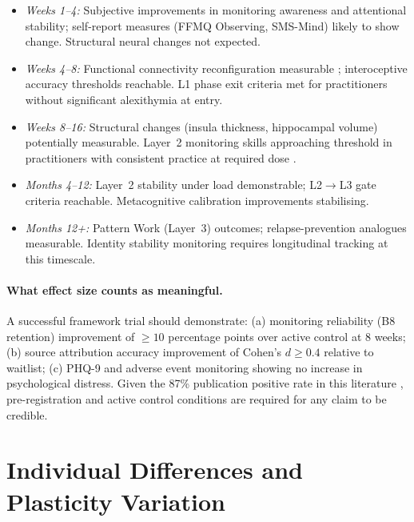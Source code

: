 \documentclass[12pt, a4paper]{article}
\begin{document}
\begin{itemize}[leftmargin=2em]
\item \emph{Weeks 1--4:} Subjective improvements in monitoring awareness and
attentional stability; self-report measures (FFMQ Observing, SMS-Mind) likely
to show change. Structural neural changes not expected.
\item \emph{Weeks 4--8:} Functional connectivity reconfiguration measurable
\citep{yue2023}; interoceptive accuracy thresholds reachable. L1 phase exit
criteria met for practitioners without significant alexithymia at entry.
\item \emph{Weeks 8--16:} Structural changes (insula thickness, hippocampal volume)
potentially measurable. Layer~2 monitoring skills approaching threshold in
practitioners with consistent practice at required dose \citep{jha2015}.
\item \emph{Months 4--12:} Layer~2 stability under load demonstrable; L2$\to$L3
gate criteria reachable. Metacognitive calibration improvements stabilising.
\item \emph{Months 12+:} Pattern Work (Layer~3) outcomes; relapse-prevention
analogues measurable. Identity stability monitoring requires longitudinal
tracking at this timescale.
\end{itemize}

\paragraph{What effect size counts as meaningful.}
A successful framework trial should demonstrate: (a) monitoring reliability
(B8 retention) improvement of $\geq 10$ percentage points over active control at
8 weeks; (b) source attribution accuracy improvement of Cohen's $d \geq 0.4$
relative to waitlist; (c) PHQ-9 and adverse event monitoring showing no increase
in psychological distress. Given the 87\% publication positive rate in this
literature \citep{coronado2016}, pre-registration and active control conditions
are required for any claim to be credible.

\section{Individual Differences and Plasticity Variation}
\end{document}
